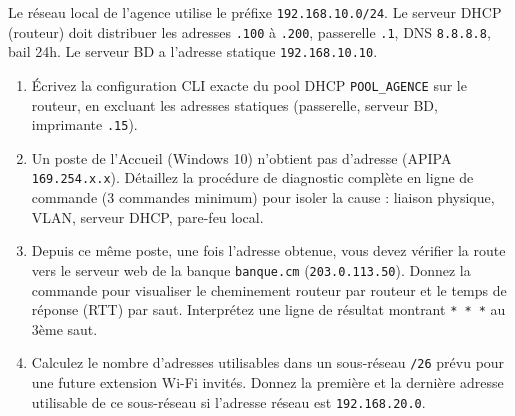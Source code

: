 \documentclass[11pt]{article}
\begin{document}
\begin{exercice}
Le réseau local de l'agence utilise le préfixe \texttt{192.168.10.0/24}. Le serveur DHCP (routeur) doit distribuer les adresses \texttt{.100} à \texttt{.200}, passerelle \texttt{.1}, DNS \texttt{8.8.8.8}, bail 24h. Le serveur BD a l'adresse statique \texttt{192.168.10.10}.
\begin{enumerate}
    \item Écrivez la configuration CLI exacte du pool DHCP \texttt{POOL\_AGENCE} sur le routeur, en excluant les adresses statiques (passerelle, serveur BD, imprimante \texttt{.15}).
    \item Un poste de l'Accueil (Windows 10) n'obtient pas d'adresse (APIPA \texttt{169.254.x.x}). Détaillez la procédure de diagnostic complète en ligne de commande (3 commandes minimum) pour isoler la cause : liaison physique, VLAN, serveur DHCP, pare-feu local.
    \item Depuis ce même poste, une fois l'adresse obtenue, vous devez vérifier la route vers le serveur web de la banque \texttt{banque.cm} (\texttt{203.0.113.50}). Donnez la commande pour visualiser le cheminement routeur par routeur et le temps de réponse (RTT) par saut. Interprétez une ligne de résultat montrant \texttt{* * *} au 3ème saut.
    \item Calculez le nombre d'adresses utilisables dans un sous-réseau \texttt{/26} prévu pour une future extension Wi-Fi invités. Donnez la première et la dernière adresse utilisable de ce sous-réseau si l'adresse réseau est \texttt{192.168.20.0}.
\end{enumerate}
\end{exercice}
\end{document}
